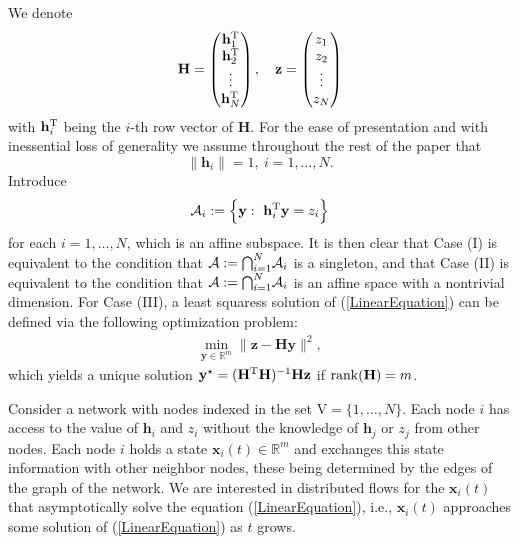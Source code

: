 \documentclass[a4paper, 11pt]{article}
\newcommand*\mcap{\mathbin{\mathpalette\mcapinn\relax}}
\newcommand*\mcapinn[2]{\vcenter{\hbox{$\mathsurround=0pt
  \ifx\displaystyle#1\textstyle\else#1\fi\bigcap$}}}
\def\T{^{\rm\tiny T}}
\begin{document}
We denote
$$
\mathbf{H}= \begin{pmatrix}
  \mathbf{h}_1\T \\
 \mathbf{h}_2\T \\
  \vdots  \\
\mathbf{h}_N\T
 \end{pmatrix}, \quad \mathbf{z}= \begin{pmatrix}
  z_1 \\
 z_2 \\
  \vdots  \\
z_N
 \end{pmatrix}
$$
with $\mathbf{h}_i\T$ being the $i$-th row vector of $\mathbf{H}$. For the ease of presentation and with inessential loss of generality we assume throughout the rest of the paper that
$$
\big\|\mathbf{h}_i\big\|=1,\ i=1,\dots,N.
$$ Introduce
\begin{align*}
\mathcal{A}_i:=\Big\{\mathbf{y}:\ \mathbf{h}_i\T \mathbf{y}=z_i \Big\}
\end{align*}
for each $i=1,\dots,N$, which is an affine subspace.  It is then clear that Case (I) is equivalent to the condition that $\mathcal{A}:= \mcap_{i=1}^N\mathcal{A}_i$ is a singleton, and that Case (II) is equivalent to the condition  that $\mathcal{A}:= \mcap_{i=1}^N\mathcal{A}_i$ is an affine space with a nontrivial dimension. For Case (III), a least squaress solution of (\ref{LinearEquation}) can be defined via the following  optimization problem:
\begin{align}
\min_{\mathbf{y}\in\mathbb{R}^m} \big\|\mathbf{z}-\mathbf{H}\mathbf{y}\big\|^2,
\end{align}
which yields a unique solution $\mathbf{y}^\star=(\mathbf{H}\T\mathbf{H})^{-1}\mathbf{H}\mathbf{z}$ if ${\rm rank}(\mathbf{H})=m$.


Consider a network with nodes  indexed in the set $\mathrm{V}=\big\{1,\dots,N\big\}$.  Each node $i$ has access to the value of $\mathbf{h}_i$ and ${z}_i$ without the knowledge of $\mathbf{h}_j$ or ${z}_j$ from other nodes. Each node $i$  holds a state $\mathbf{x}_i(t) \in\mathbb{R}^m$ and exchanges this state information with other neighbor nodes, these being determined by the edges of the graph of the network.
We are interested in distributed flows for the $\mathbf{x}_i(t)$ that asymptotically solve the equation (\ref{LinearEquation}), i.e., $\mathbf{x}_i(t)$ approaches some solution of  (\ref{LinearEquation}) as $t$ grows.
\end{document}
